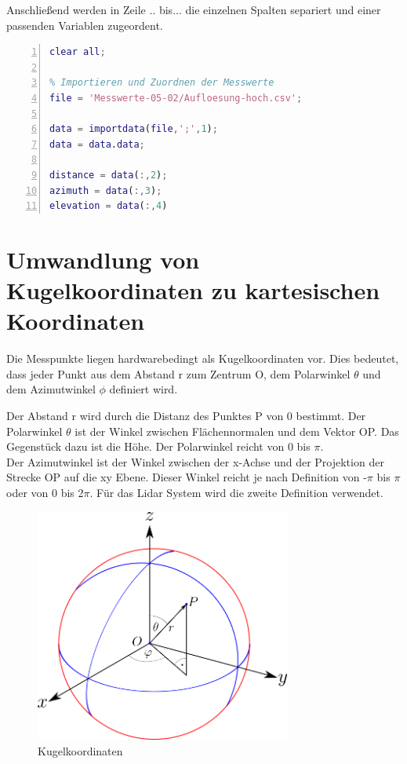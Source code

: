 Anschließend werden in Zeile .. bis... die einzelnen Spalten separiert und einer passenden Variablen zugeordent. 

\begin{lstlisting}[caption={Importieren und Zuordnen von .csv Dateien},language={Matlab}, label={import_data}, numbers=left]
% Anwendung zur Darstellung einer 3D Punktewolke aus einem LIDAR System
clear all;

% Importieren und Zuordnen der Messwerte
file = 'Messwerte-05-02/Aufloesung-hoch.csv';

data = importdata(file,';',1); 
data = data.data;

distance = data(:,2);
azimuth = data(:,3);
elevation = data(:,4)
\end{lstlisting}


\section{Umwandlung von Kugelkoordinaten zu kartesischen Koordinaten}

Die Messpunkte liegen hardwarebedingt als Kugelkoordinaten vor. Dies bedeutet, dass jeder Punkt aus dem Abstand r zum Zentrum O, dem Polarwinkel $\theta$ und dem Azimutwinkel $\phi$ definiert wird.

Der Abstand r wird durch die Distanz des Punktes P von 0 bestimmt. Der Polarwinkel $\theta$ ist der Winkel zwischen Flächennormalen und dem Vektor OP. Das Gegenstück dazu ist die Höhe.  Der Polarwinkel reicht von 0 bis $\pi$. \\
Der Azimutwinkel ist der Winkel zwischen der x-Achse und der Projektion der Strecke OP auf die xy Ebene. Dieser Winkel reicht je nach Definition von  -$\pi$ bis $\pi$ oder von 0 bis 2$\pi$. Für das Lidar System wird die zweite Definition verwendet.

\begin{figure}[H]
	\centering
	\includegraphics[width=0.75\textwidth]{images/Auswertung/Kugelkoordinaten}
	\caption{Kugelkoordinaten}
	\label{kugelkoordinaten}
\end{figure}




